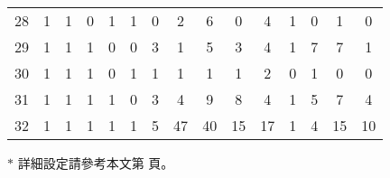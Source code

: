 \begin{small}
\begin{threeparttable}[h]
\begin{tabular}{c|ccccc|ccccc|cccc}
28  &   1   &   1   &   0   &   1   &   1   &   0   &   2   &   6   &   0   &   4   &   1   &   0   &   1   &   0   \\
29  &   1   &   1   &   1   &   0   &   0   &   3   &   1   &   5   &   3   &   4   &   1   &   7   &   7   &   1   \\
30  &   1   &   1   &   1   &   0   &   1   &   1   &   1   &   1   &   1   &   2   &   0   &   1   &   0   &   0   \\
31  &   1   &   1   &   1   &   1   &   0   &   3   &   4   &   9   &   8   &   4   &   1   &   5   &   7   &   4   \\
32  &   1   &   1   &   1   &   1   &   1   &   5   &   47  &   40  &   15  &   17  &   1   &   4   &   15  &   10  \\\hline
\end{tabular}
\begin{tablenotes}\small
\item[$\ast$] 詳細設定請參考本文第 \pageref{r5t} 頁。
\end{tablenotes}
\end{threeparttable}
\end{small}




\clearpage
